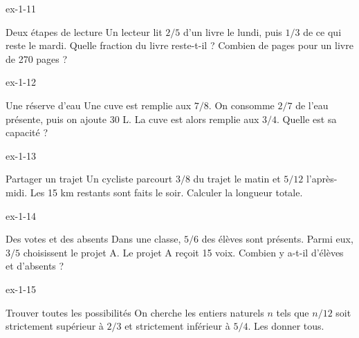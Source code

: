 \clearpage{}
\begin{blocLivre}{ex-1-11}\begin{exercice}[3]{Deux étapes de lecture}
Un lecteur lit $2/5$ d’un livre le lundi, puis $1/3$ de ce qui reste le mardi. Quelle fraction du livre reste-t-il ? Combien de pages pour un livre de 270 pages ?
\end{exercice}\end{blocLivre}
\begin{blocLivre}{ex-1-12}\begin{exercice}[3]{Une réserve d’eau}
Une cuve est remplie aux $7/8$. On consomme $2/7$ de l’eau présente, puis on ajoute 30 L. La cuve est alors remplie aux $3/4$. Quelle est sa capacité ?
\end{exercice}\end{blocLivre}
\begin{blocLivre}{ex-1-13}\begin{exercice}[3]{Partager un trajet}
Un cycliste parcourt $3/8$ du trajet le matin et $5/12$ l’après-midi. Les 15 km restants sont faits le soir. Calculer la longueur totale.
\end{exercice}\end{blocLivre}
\begin{blocLivre}{ex-1-14}\begin{exercice}[3]{Des votes et des absents}
Dans une classe, $5/6$ des élèves sont présents. Parmi eux, $3/5$ choisissent le projet A. Le projet A reçoit 15 voix. Combien y a-t-il d’élèves et d’absents ?
\end{exercice}\end{blocLivre}
\begin{blocLivre}{ex-1-15}\begin{exercice}[3]{Trouver toutes les possibilités}
On cherche les entiers naturels $n$ tels que $n/12$ soit strictement supérieur à $2/3$ et strictement inférieur à $5/4$. Les donner tous.
\end{exercice}\end{blocLivre}

\clearpage
